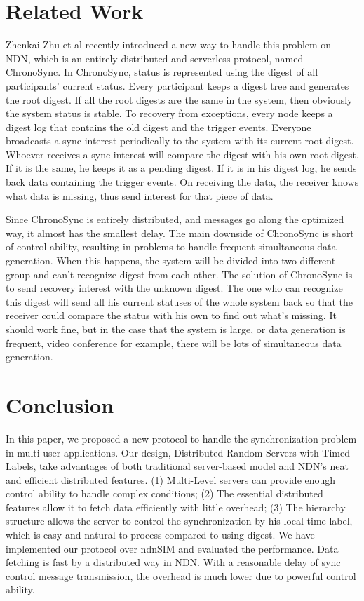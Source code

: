 \documentclass[conference]{IEEEtran}
\begin{document}
\section{Related Work}
\label{related_work}
Zhenkai Zhu et al recently introduced a new way to handle this problem on NDN, which is an entirely distributed and serverless protocol, named ChronoSync.
In ChronoSync, status is represented using the digest of all participants' current status. Every participant keeps a digest tree and generates the root digest. If all the root digests are the same in the system, then obviously the system status is stable. To recovery from exceptions, every node keeps a digest log that contains the old digest and the trigger events.
Everyone broadcasts a sync interest periodically to the system with its current root digest. Whoever receives a sync interest will compare the digest with his own root digest. If it is the same, he keeps it as a pending digest. If it is in his digest log, he sends back data containing the trigger events. On receiving the data, the receiver knows what data is missing, thus send interest for that piece of data.

Since ChronoSync is entirely distributed, and messages go along the optimized way, it almost has the smallest delay. The main downside of ChronoSync is short of control ability, resulting in problems to handle frequent simultaneous data generation. When this happens, the system will be divided into two different group and can't recognize digest from each other. The solution of ChronoSync is to send recovery interest with the unknown digest. The one who can recognize this digest will send all his current statuses of the whole system back so that the receiver could compare the status with his own to find out what's missing. It should work fine, but in the case that the system is large, or data generation is frequent, video conference for example, there will be lots of simultaneous data generation.

\section{Conclusion}
\label{conclusion}
In this paper, we proposed a new protocol to handle the synchronization problem in multi-user applications. Our design, Distributed Random Servers with Timed Labels, take advantages of both traditional server-based model and NDN's neat and efficient distributed features. (1) Multi-Level servers can provide enough control ability to handle complex conditions; (2) The essential distributed features allow it to fetch data efficiently with little overhead; (3) The hierarchy structure allows the server to control the synchronization by his local time label, which is easy and natural to process compared to using digest. We have implemented our protocol over ndnSIM and evaluated the performance. Data fetching is fast by a distributed way in NDN. With a reasonable delay of sync control message transmission, the overhead is much lower due to powerful control ability. 
\end{document}
